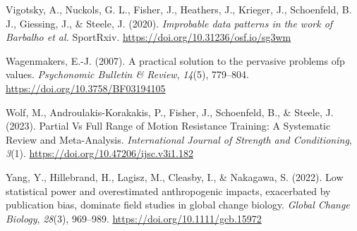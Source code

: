 \documentclass[
]{article}
\newlength{\cslhangindent}
\newlength{\cslentryspacingunit} %
\newenvironment{CSLReferences}[2] %
 {%
  \setlength{\parindent}{0pt}
  \ifodd #1
  \let\oldpar\par
  \def\par{\hangindent=\cslhangindent\oldpar}
  \fi
  \setlength{\parskip}{#2\cslentryspacingunit}
 }%
 {}
\begin{document}
\begin{CSLReferences}{1}{0}
\leavevmode{}%
Vigotsky, A., Nuckols, G. L., Fisher, J., Heathers, J., Krieger, J., Schoenfeld, B. J., Giessing, J., \& Steele, J. (2020). \emph{Improbable data patterns in the work of {Barbalho} et al.} SportRxiv. \url{https://doi.org/10.31236/osf.io/sg3wm}

\leavevmode{}%
Wagenmakers, E.-J. (2007). A practical solution to the pervasive problems ofp values. \emph{Psychonomic Bulletin \& Review}, \emph{14}(5), 779--804. \url{https://doi.org/10.3758/BF03194105}

\leavevmode{}%
Wolf, M., Androulakis-Korakakis, P., Fisher, J., Schoenfeld, B., \& Steele, J. (2023). Partial {Vs} {Full} {Range} of {Motion} {Resistance} {Training}: {A} {Systematic} {Review} and {Meta}-{Analysis}. \emph{International Journal of Strength and Conditioning}, \emph{3}(1). \url{https://doi.org/10.47206/ijsc.v3i1.182}

\leavevmode{}%
Yang, Y., Hillebrand, H., Lagisz, M., Cleasby, I., \& Nakagawa, S. (2022). Low statistical power and overestimated anthropogenic impacts, exacerbated by publication bias, dominate field studies in global change biology. \emph{Global Change Biology}, \emph{28}(3), 969--989. \url{https://doi.org/10.1111/gcb.15972}

\end{CSLReferences}
\end{document}
